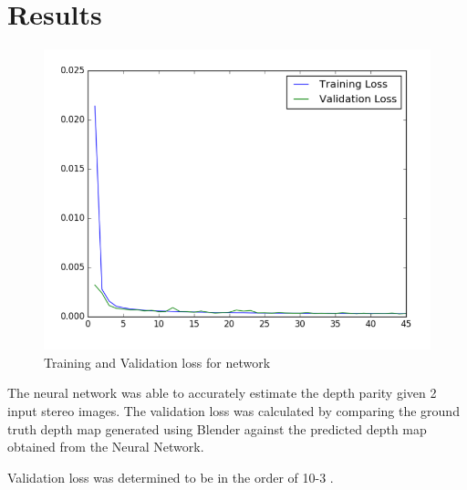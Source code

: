 \section{Results}

\begin{figure}
  \includegraphics[width=\linewidth]{images/validationloss.png}
  \caption{Training and Validation loss for network}
  \label{fig:boat1}
\end{figure}

The neural network was able to accurately estimate the depth parity given 2 input stereo images. The validation loss was calculated by comparing the ground truth depth map generated using Blender against the predicted depth map obtained from the Neural Network.

Validation loss was determined to be in the order of 10-3 . 

